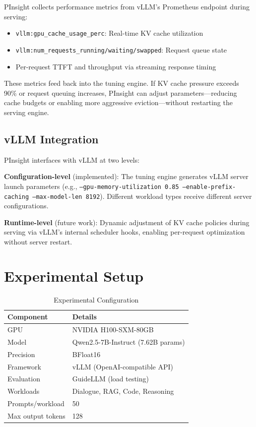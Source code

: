 \documentclass[conference]{IEEEtran}
\begin{document}
PInsight collects performance metrics from vLLM's Prometheus endpoint during serving:
\begin{itemize}
\item \texttt{vllm:gpu\_cache\_usage\_perc}: Real-time KV cache utilization
\item \texttt{vllm:num\_requests\_running/waiting/swapped}: Request queue state
\item Per-request TTFT and throughput via streaming response timing
\end{itemize}

These metrics feed back into the tuning engine. If KV cache pressure exceeds 90\% or request queuing increases, PInsight can adjust parameters---reducing cache budgets or enabling more aggressive eviction---without restarting the serving engine.

\subsection{vLLM Integration}

PInsight interfaces with vLLM at two levels:

\textbf{Configuration-level} (implemented): The tuning engine generates vLLM server launch parameters (e.g., \texttt{--gpu-memory-utilization 0.85 --enable-prefix-caching --max-model-len 8192}). Different workload types receive different server configurations.

\textbf{Runtime-level} (future work): Dynamic adjustment of KV cache policies during serving via vLLM's internal scheduler hooks, enabling per-request optimization without server restart.

\section{Experimental Setup}

\begin{table}[h]
\centering
\caption{Experimental Configuration}
\label{tab:setup}
\begin{tabular}{@{}ll@{}}
\toprule
\textbf{Component} & \textbf{Details} \\
\midrule
GPU & NVIDIA H100-SXM-80GB \\
Model & Qwen2.5-7B-Instruct (7.62B params) \\
Precision & BFloat16 \\
Framework & vLLM (OpenAI-compatible API) \\
Evaluation & GuideLLM (load testing) \\
Workloads & Dialogue, RAG, Code, Reasoning \\
Prompts/workload & 50 \\
Max output tokens & 128 \\
\bottomrule
\end{tabular}
\end{table}
\end{document}
